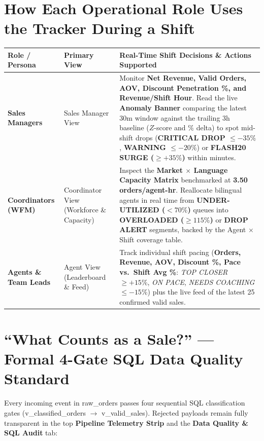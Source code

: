 \documentclass[10pt,letterpaper]{article}
\newcommand{\code}[1]{{\fontfamily{pcr}\selectfont\footnotesize\color{ink}#1}}
\begin{document}
\section{How Each Operational Role Uses the Tracker During a Shift}
\renewcommand{\arraystretch}{1.12}
\begin{tabularx}{\textwidth}{@{}>{\raggedright\arraybackslash}p{1.16in} >{\raggedright\arraybackslash}p{1.42in} >{\raggedright\arraybackslash}X@{}}
\toprule
\rowcolor{linen}
\textbf{\color{ink}Role / Persona} & \textbf{\color{ink}Primary View} & \textbf{\color{ink}Real-Time Shift Decisions \& Actions Supported} \\
\midrule
\textbf{\color{ink}Sales Managers} &
Sales Manager View &
Monitor \textbf{Net Revenue, Valid Orders, AOV, Discount Penetration \%, and Revenue/Shift Hour}. Read the live \textbf{Anomaly Banner} comparing the latest 30m window against the trailing 3h baseline ($Z$-score and $\%$ delta) to spot mid-shift drops (\textbf{CRITICAL DROP $\leq -35\%$}, \textbf{WARNING $\leq -20\%$}) or \textbf{FLASH20 SURGE ($\geq +35\%$)} within minutes. \\
\rowcolor{cream}
\textbf{\color{ink}Coordinators (WFM)} &
Coordinator View (Workforce \& Capacity) &
Inspect the \textbf{Market $\times$ Language Capacity Matrix} benchmarked at \textbf{3.50 orders/agent-hr}. Reallocate bilingual agents in real time from \textbf{UNDER-UTILIZED ($<70\%$)} queues into \textbf{OVERLOADED ($\geq 115\%$)} or \textbf{DROP ALERT} segments, backed by the Agent $\times$ Shift coverage table. \\
\textbf{\color{ink}Agents \& Team Leads} &
Agent View (Leaderboard \& Feed) &
Track individual shift pacing (\textbf{Orders, Revenue, AOV, Discount \%, Pace vs.\ Shift Avg \%}: \textit{TOP CLOSER $\geq +15\%$}, \textit{ON PACE}, \textit{NEEDS COACHING $\leq -15\%$}) plus the live feed of the latest 25 confirmed valid sales. \\
\bottomrule
\end{tabularx}

\section{``What Counts as a Sale?'' --- Formal 4-Gate SQL Data Quality Standard}
Every incoming event in \code{raw\_orders} passes four sequential SQL classification gates (\code{v\_classified\_orders} $\rightarrow$ \code{v\_valid\_sales}). Rejected payloads remain fully transparent in the top \textbf{Pipeline Telemetry Strip} and the \textbf{Data Quality \& SQL Audit} tab:
\end{document}
